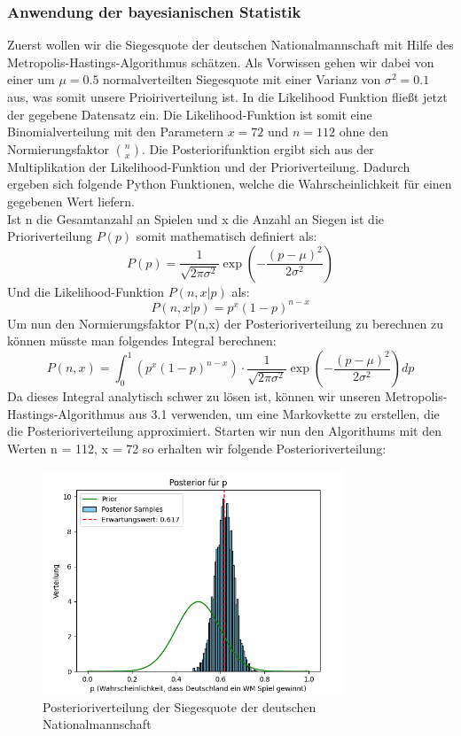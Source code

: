 \documentclass[a4paper,12pt]{article}
\begin{document}
\subsubsection{Anwendung der bayesianischen Statistik}
Zuerst wollen wir die Siegesquote der deutschen Nationalmannschaft mit Hilfe des Metropolis-Hastings-Algorithmus schätzen. Als Vorwissen gehen wir dabei von einer um $\mu = 0.5$ normalverteilten Siegesquote mit einer Varianz von $\sigma^2 = 0.1$ aus, was somit unsere Prioiriverteilung ist. In die Likelihood Funktion fließt jetzt der gegebene Datensatz ein. Die Likelihood-Funktion ist somit eine Binomialverteilung mit den Parametern $x = 72$ und $n = 112$ ohne den Normierungsfaktor $\binom{n}{x}$. Die Posteriorifunktion ergibt sich aus der Multiplikation der Likelihood-Funktion und der Prioriverteilung. Dadurch ergeben sich folgende Python Funktionen, welche die Wahrscheinlichkeit für einen gegebenen Wert liefern.\\ 

\newpage
\noindent Ist n die Gesamtanzahl an Spielen und x die Anzahl an Siegen ist die Prioriverteilung $P(p)$ somit mathematisch definiert als:
\begin{equation}
  P(p) = \frac{1}{\sqrt{2\pi\sigma^2}} \exp{\left(-\frac{(p-\mu)^2}{2\sigma^2}\right)}
\end{equation}
Und die Likelihood-Funktion $P(n,x|p)$ als:
\begin{equation}
  P(n,x|p) = p^x(1-p)^{n-x}
\end{equation}
Um nun den Normierungsfaktor P(n,x) der Posterioriverteilung zu berechnen zu können müsste man folgendes Integral berechnen:
\begin{equation}
  P(n,x) = \int_{0}^{1} (p^x(1-p)^{n-x}) \cdot \frac{1}{\sqrt{2\pi\sigma^2}} \exp{\left(-\frac{(p-\mu)^2}{2\sigma^2}\right)} dp
\end{equation}
Da dieses Integral analytisch schwer zu lösen ist, können wir unseren Metropolis-Hastings-Algorithmus aus 3.1 verwenden, um eine Markovkette zu erstellen, die die Posterioriverteilung approximiert. Starten wir nun den Algorithums mit den Werten n = 112, x = 72 so erhalten wir folgende Posterioriverteilung:
\begin{figure}[H]
  \centering
  \includegraphics[width=0.8\textwidth]{../images/world_cup_germany.png}
  \caption{Posterioriverteilung der Siegesquote der deutschen Nationalmannschaft}
\end{figure}
\end{document}
